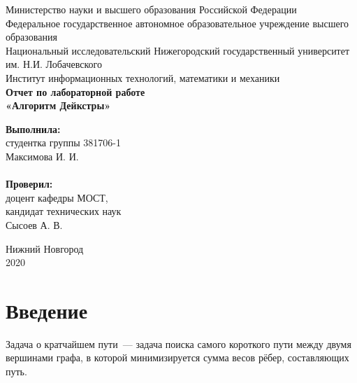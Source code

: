 \documentclass{article}
\begin{document}
\begin{titlepage}

\begin{center}
Министерство науки и высшего образования Российской Федерации \\
\vspace{5mm}
Федеральное государственное автономное образовательное учреждение высшего образования \\
Национальный исследовательский Нижегородский государственный университет им. Н.И. Лобачевского \\
\vspace{1cm}
Институт информационных технологий, математики и механики \\
\vspace{5cm}
\textbf{\large Отчет по лабораторной работе} \\
\vspace{8mm}
\textbf{\Large «Алгоритм Дейкстры»} \\
\end{center}

\vspace{3cm}

\newbox{\lbox}
\newlength{\maxl}
\setlength{\maxl}{\wd\lbox}
\hfill\parbox{7cm}{
\hspace*{5cm}\hspace*{-5cm}\textbf{Выполнила:} \\ студентка группы 381706-1 \\ Максимова И. И.\\
\\
\hspace*{5cm}\hspace*{-5cm}\textbf{Проверил:}\\ доцент кафедры МОСТ, \\ кандидат технических наук \\ Сысоев А. В.
}

\vspace{\fill}

\begin{center} 
Нижний Новгород \\ 2020
\end{center}
\end{titlepage}

\setcounter{page}{2}

\tableofcontents

\newpage

\section{Введение}
Задача о кратчайшем пути~--- задача поиска самого короткого пути между двумя вершинами графа, в которой минимизируется сумма весов рёбер, составляющих путь.
\end{document}
